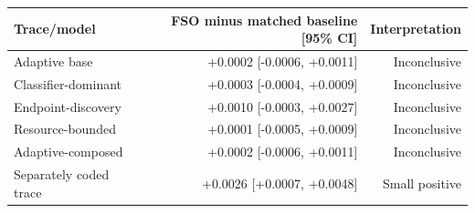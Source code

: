 \begin{tabular}{lrr}
\toprule
Trace/model & FSO minus matched baseline [95\% CI] & Interpretation \\
\midrule
Adaptive base & +0.0002 [-0.0006, +0.0011] & Inconclusive \\
Classifier-dominant & +0.0003 [-0.0004, +0.0009] & Inconclusive \\
Endpoint-discovery & +0.0010 [-0.0003, +0.0027] & Inconclusive \\
Resource-bounded & +0.0001 [-0.0005, +0.0009] & Inconclusive \\
Adaptive-composed & +0.0002 [-0.0006, +0.0011] & Inconclusive \\
Separately coded trace & +0.0026 [+0.0007, +0.0048] & Small positive \\
\bottomrule
\end{tabular}
